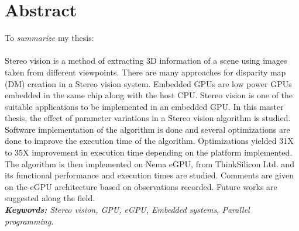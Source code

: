 \chapter*{Abstract}
\label{chap:abstract}

%
To \textit{summarize} my thesis:\\
\\

Stereo vision is a method of extracting 3D information of a scene using images taken from different viewpoints. There are many approaches for disparity map (DM) creation in a Stereo vision system. Embedded GPUs are low power GPUs embedded in the same chip along with the host CPU. Stereo vision is one of the suitable applications to be implemented in an embedded GPU. In this master thesis, the effect of parameter variations in a Stereo vision algorithm is studied. Software implementation of the algorithm is done and several optimizations are done to improve the execution time of the algorithm. Optimizations yielded 31X to 35X improvement in execution time depending on the platform implemented. The algorithm is then implemented on Nema eGPU, from ThinkSilicon Ltd. and its functional performance and execution times are studied. Comments are given on the eGPU architecture based on observations recorded. Future works are suggested along the field.\\

\noindent
\textsl{\textbf{Keywords:} Stereo vision, GPU, eGPU, Embedded systems, Parallel programming.}